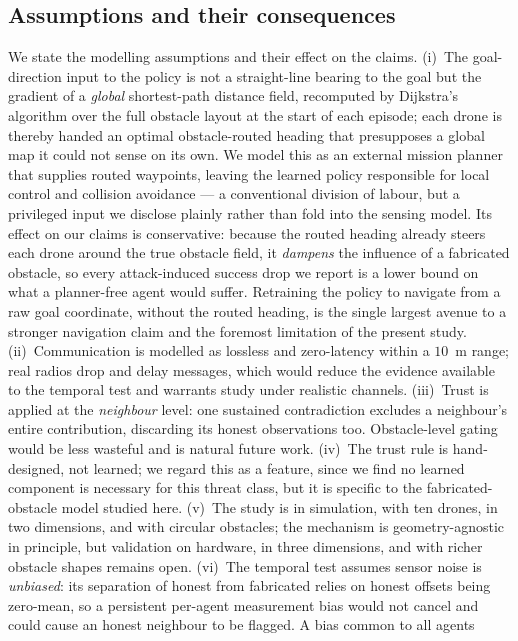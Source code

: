 \subsection{Assumptions and their consequences}
We state the modelling assumptions and their effect on the claims. (i)~The goal-direction input to the
policy is not a straight-line bearing to the goal but the gradient of a
\emph{global} shortest-path distance field, recomputed by Dijkstra's
algorithm over the full obstacle layout at the start of each episode; each
drone is thereby handed an optimal obstacle-routed heading that presupposes a
global map it could not sense on its own. We model this as an external
mission planner that supplies routed waypoints, leaving the learned policy
responsible for local control and collision avoidance --- a conventional
division of labour, but a privileged input we disclose plainly rather than
fold into the sensing model. Its effect on our claims is conservative:
because the routed heading already steers each drone around the true obstacle
field, it \emph{dampens} the influence of a fabricated obstacle, so every
attack-induced success drop we report is a lower bound on what a planner-free
agent would suffer. Retraining the policy to navigate from a raw goal
coordinate, without the routed heading, is the single largest avenue to a
stronger navigation claim and the foremost limitation of the present study. (ii)~Communication is modelled as
lossless and zero-latency within a $10$~m range; real radios drop and delay
messages, which would reduce the evidence available to the temporal test and
warrants study under realistic channels. (iii)~Trust is applied at the
\emph{neighbour} level: one sustained contradiction excludes a neighbour's
entire contribution, discarding its honest observations too. Obstacle-level
gating would be less wasteful and is natural future work. (iv)~The trust
rule is hand-designed, not learned; we regard this as a feature, since we
find no learned component is necessary for this threat class, but it is
specific to the fabricated-obstacle model studied here. (v)~The study is in
simulation, with ten drones, in two dimensions, and with circular obstacles;
the mechanism is geometry-agnostic in principle, but validation on hardware,
in three dimensions, and with richer obstacle shapes remains open.
(vi)~The temporal test assumes sensor noise is \emph{unbiased}: its
separation of honest from fabricated relies on honest offsets being
zero-mean, so a persistent per-agent measurement bias would not cancel and
could cause an honest neighbour to be flagged. A bias common to all agents
